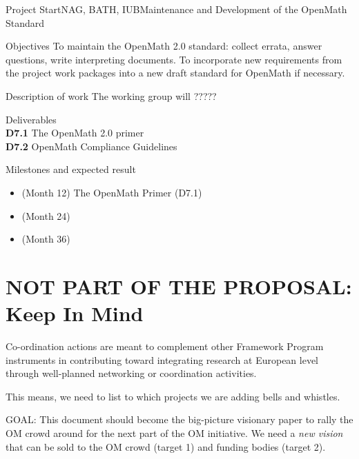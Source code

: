 \documentclass{euproposal}
\begin{document}
\newpage

\begin{workpackage}{36}{7}{Project Start}{NAG, BATH, IUB}{Maintenance and Development
    of the OpenMath Standard}
\begin{wpbox}{Objectives}
  To maintain the OpenMath 2.0 standard: collect errata, answer questions, write
  interpreting documents. To incorporate new requirements from the project work
  packages into a new draft standard for OpenMath if necessary.
\end{wpbox}
\begin{wpbox}{Description of work}
  The working group will  ?????
\end{wpbox}
\begin{wpbox}{Deliverables\\}
{\bf D7.1} The OpenMath 2.0 primer\\
{\bf D7.2} OpenMath Compliance Guidelines\\
\end{wpbox}
\begin{wpbox}{Milestones and expected result}
\begin{itemize}
\item (Month 12) The OpenMath Primer (D7.1)
\item (Month 24) 
\item (Month 36) 
\end{itemize}
\end{wpbox}
\end{workpackage}

\newpage

\section{NOT PART OF THE PROPOSAL:  Keep In Mind}
Co-ordination actions are meant to complement other Framework Program
instruments in contributing toward integrating research at European
level through well-planned networking or coordination activities.

This means, we need to list to which projects we are adding bells and
whistles.

GOAL: This document should become the big-picture visionary paper to
rally the OM crowd around for the next part of the OM initiative.  We
need a \emph{new vision} that can be sold to the OM crowd (target 1)
and funding bodies (target 2).
\end{document}
